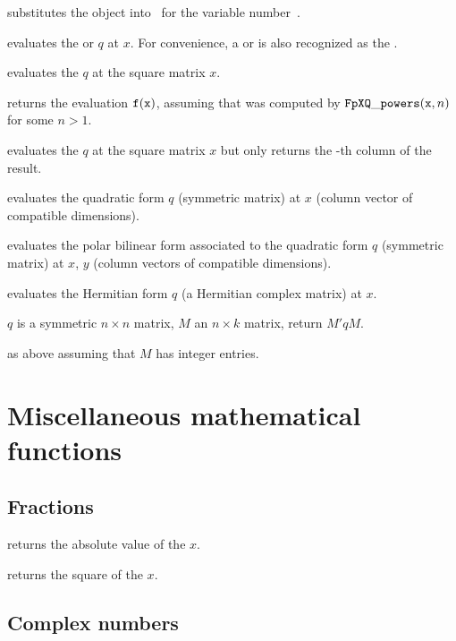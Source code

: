  substitutes the object 
into~ for the variable number~.

 evaluates the  or 
$q$ at $x$. For convenience, a  or  is also recognized as
the  .

 evaluates the  $q$ at the
square matrix $x$.

 returns
the evaluation ${\tt f}({\tt x})$, assuming that  was computed by
${\tt FpXQ\_powers}({\tt x}, n)$ for some $n>1$.

 evaluates the  $q$
at the square matrix $x$ but only returns the -th column of the result.

 evaluates the quadratic form
$q$ (symmetric matrix) at $x$ (column vector of compatible dimensions).

 evaluates the polar bilinear form
associated to the quadratic form $q$ (symmetric matrix) at $x$, $y$ (column
vectors of compatible dimensions).

 evaluates the Hermitian form $q$
(a Hermitian complex matrix) at $x$.

 $q$ is a symmetric $n\times n$ matrix,
$M$ an $n\times k$ matrix, return $M' q M$.

 as above assuming that $M$ has integer
entries.

\newpage
\chapter{Miscellaneous mathematical functions}

\section{Fractions}

 returns the absolute value of the  $x$.

 returns the square of the  $x$.

\section{Complex numbers}


